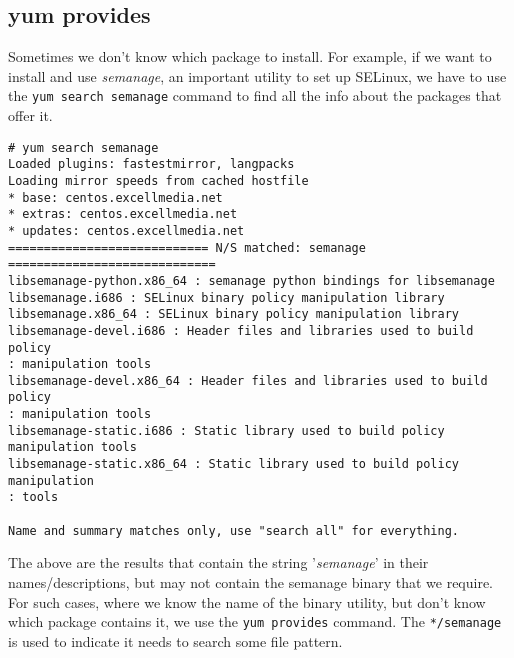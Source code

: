 \subsection{yum provides}
Sometimes we don't know which package to install. For example, if we want to install and use \textit{semanage}, an important utility to set up SELinux, we have to use the \verb|yum search semanage| command to find all the info about the packages that offer it. 

\vspace{-15pt}
\begin{verbatim}
# yum search semanage
Loaded plugins: fastestmirror, langpacks
Loading mirror speeds from cached hostfile
* base: centos.excellmedia.net
* extras: centos.excellmedia.net
* updates: centos.excellmedia.net
============================ N/S matched: semanage =============================
libsemanage-python.x86_64 : semanage python bindings for libsemanage
libsemanage.i686 : SELinux binary policy manipulation library
libsemanage.x86_64 : SELinux binary policy manipulation library
libsemanage-devel.i686 : Header files and libraries used to build policy
: manipulation tools
libsemanage-devel.x86_64 : Header files and libraries used to build policy
: manipulation tools
libsemanage-static.i686 : Static library used to build policy manipulation tools
libsemanage-static.x86_64 : Static library used to build policy manipulation
: tools

Name and summary matches only, use "search all" for everything.
\end{verbatim}
\vspace{-10pt}

\noindent
The above are the results that contain the string '\textit{semanage}' in their names/descriptions, but may not contain the semanage binary that we require. For such cases, where we know the name of the binary utility, but don't know which package contains it, we use the \verb|yum provides| command. The \verb|*/semanage| is used to indicate it needs to search some file pattern. 

